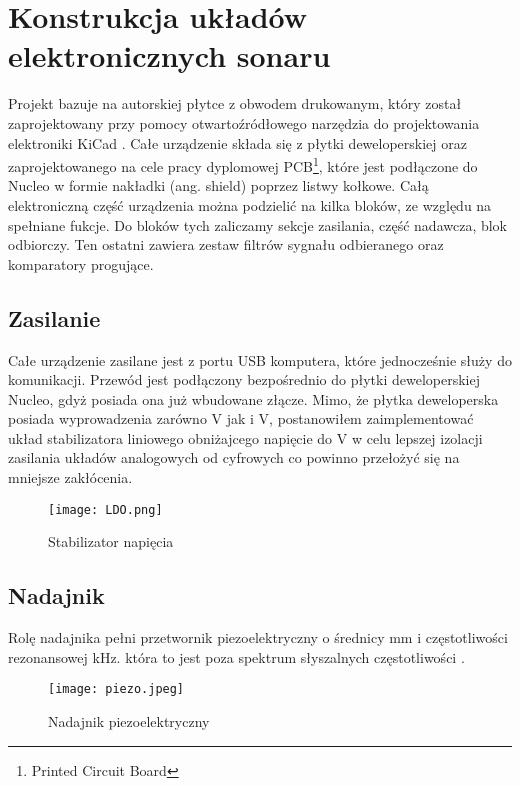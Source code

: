 \section{Konstrukcja układów elektronicznych sonaru}
Projekt bazuje na autorskiej płytce z obwodem drukowanym, który został zaprojektowany przy pomocy 
otwartoźródłowego narzędzia do projektowania elektroniki KiCad \cite{kicad}. 
Całe urządzenie składa się z płytki deweloperskiej oraz zaprojektowanego na cele pracy dyplomowej 
PCB\footnote[1]{Printed Circuit Board}, które
jest podłączone do Nucleo w formie nakładki (ang. shield)  poprzez listwy kołkowe.
Całą elektroniczną część urządzenia można podzielić na kilka bloków, ze względu na spełniane fukcje. 
Do bloków tych zaliczamy sekcje zasilania, część nadawcza, blok odbiorczy. Ten ostatni zawiera zestaw filtrów sygnału odbieranego oraz komparatory progujące.

\subsection{Zasilanie}
Całe urządzenie zasilane jest z portu USB komputera, które jednocześnie służy do komunikacji. 
Przewód jest podłączony bezpośrednio do płytki deweloperskiej Nucleo, gdyż posiada ona już wbudowane złącze. 
Mimo, że płytka deweloperska posiada wyprowadzenia zarówno \unit[5]{V} jak i \unit[3,3]{V}, 
postanowiłem zaimplementować układ stabilizatora liniowego obniżajcego napięcie do \unit[3,3]{V} w celu lepszej izolacji zasilania układów analogowych od cyfrowych co powinno przełożyć się na mniejsze zakłócenia.
\begin{figure}[ht!]
    \centering
    \texttt{[image: LDO.png]}
    \caption{Stabilizator napięcia}
    \label{fig:ldo}
\end{figure}

\subsection{Nadajnik}
Rolę nadajnika pełni przetwornik piezoelektryczny o średnicy \unit[16]{mm} i częstotliwości rezonansowej \unit[40]{kHz}. która to jest poza spektrum słyszalnych częstotliwości .
\begin{figure}[ht!]
    \centering
    \texttt{[image: piezo.jpeg]}
    \caption{Nadajnik piezoelektryczny}
    \label{fig:piezo}
\end{figure}

